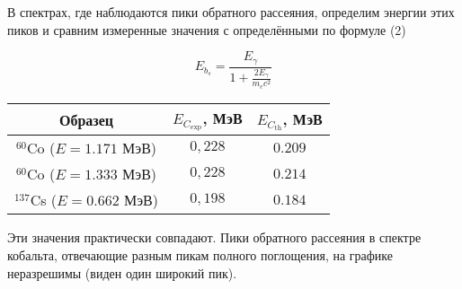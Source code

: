 В спектрах, где наблюдаются пики обратного рассеяния, определим энергии этих
пиков и сравним измеренные значения с определёнными по формуле (2)

\begin{equation}
  E_{b_s} = \frac{E_{\gamma}}{1 + \frac{2E_{\gamma}}{m_e c^2}}
\end{equation}

\begin{center}
\begin{table}
\begin{tabular}{| c | c | c |}
  \hline
  Образец & $E_{C_{\text{exp}}}$, МэВ & $E_{C_{\text{th}}}$, МэВ \\
  \hline
  ${}^{60}$Co ($E = 1.171$ МэВ) & $0,228$ & $0.209$ \\
  \hline
  ${}^{60}$Co ($E = 1.333$ МэВ) & $0,228$ & $0.214$ \\
  \hline
  ${}^{137}$Cs ($E = 0.662$ МэВ) & $0,198$ & $0.184$ \\
  \hline
\end{tabular}
\end{table}
\end{center}

Эти значения практически совпадают. Пики обратного рассеяния в спектре кобальта,
отвечающие разным пикам полного поглощения, на графике неразрешимы (виден один
широкий пик).
